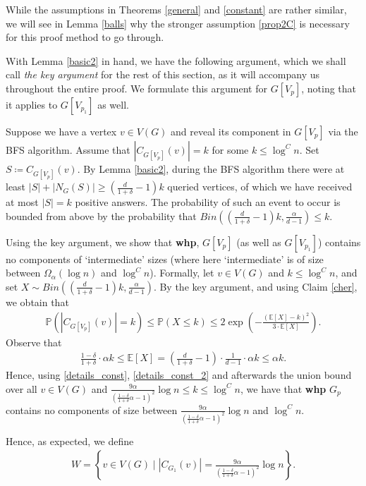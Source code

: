\documentclass[notitlepage]{scrartcl}
\begin{document}
While the assumptions in Theorems \ref{general} and \ref{constant} are rather similar, we will see in Lemma \ref{balls} why the stronger assumption \ref{prop2C} is necessary for this proof method to go through.

With Lemma \ref{basic2} in hand, we have the following argument, which we shall call \textit{the key argument} for the rest of this section, as it will accompany us throughout the entire proof. We formulate this argument for $G[V_p]$, noting that it applies to $G[V_{p_1}]$ as well.

Suppose we have a vertex $v\in V(G)$ and reveal its component in $G[V_p]$ via the BFS algorithm. Assume that $|C_{G[V_p]}(v)|=k$ for some $k\le \log^C n$. Set $S\coloneqq C_{G[V_p]}(v)$. By Lemma \ref{basic2}, during the BFS algorithm there were at least $|S|+|N_G(S)|\ge \left(\frac{d}{1+\delta}-1\right)k$ queried vertices, of which we have received at most $|S|=k$ positive answers. 
The probability of such an event to occur is bounded from above by the probability that $Bin\left(\left(\frac{d}{1+\delta}-1\right)k, \frac{\alpha}{d-1}\right)\le k$.

Using the key argument, we show that \textbf{whp}, $G[V_p]$ (as well as $G[V_{p_1}]$) contains no components of `intermediate' sizes (where here `intermediate' is of size between $\Omega_{\alpha}(\log n)$ and $\log^C n$). Formally, let $v\in V(G)$ and $k\le \log^C n$, and set $X\sim Bin\left(\left(\frac{d}{1+\delta}-1\right)k, \frac{\alpha}{d-1}\right)$. By the key argument, and using Claim \ref{cher}, we obtain that
\begin{align}\label{details_const}
    \mathbb{P}(|C_{G[V_p]}(v)|=k)\le \mathbb{P}\left(X\leq k\right)\le 2\exp\left(-\frac{(\mathbb{E}[X]-k)^2}{3\cdot \mathbb{E}[X]}\right).
\end{align}
Observe that
\begin{align}\label{details_const_2}
    \frac{1-\delta}{1+\delta}\cdot \alpha k\le \mathbb{E}[X]=\left(\frac{d}{1+\delta}-1\right)\cdot \frac{1}{d-1}\cdot \alpha k\le \alpha k.
\end{align}
Hence, using \eqref{details_const}, \eqref{details_const_2} and afterwards the union bound over all $v\in V(G)$ and $\frac{9\alpha}{\left(\frac{1-\delta}{1+\delta}\alpha-1\right)^2}\log n\le k\le \log^C n$, we have that \textbf{whp} $G_p$ contains no components of size between $\frac{9\alpha}{\left(\frac{1-\delta}{1+\delta}\alpha-1\right)^2}\log n$ and $\log^C n$.

Hence, as expected, we define
\begin{align*}
    W=\left\{v\in V(G)\;\bigg|\; |C_{G_1}(v)|=\frac{9\alpha}{\left(\frac{1-\delta}{1+\delta}\alpha-1\right)^2}\log n\right\}.
\end{align*} 
\end{document}
